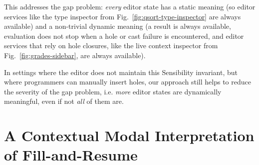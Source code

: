 This addresses the gap problem: \emph{every} editor state has a {static
meaning} (so editor services like the type inspector from Fig.~\ref{fig:qsort-type-inspector} are always available) and a non-trivial {dynamic meaning} (a result is always available, evaluation does not stop when a hole or cast failure is encountered, and editor services that rely on hole closures, like the live context inspector from Fig.~\ref{fig:grades-sidebar}, are always available).

In settings where the editor does not maintain this Sensibility invariant, but where programmers can manually insert holes, our approach still helps to reduce the severity of the gap problem, i.e. \emph{more} editor states are dynamically meaningful, even if not \emph{all} of them are.%
%






\newcommand{\commutativitySec}{A Contextual Modal Interpretation of Fill-and-Resume}
\section{\protect\commutativitySec}
\label{sec:resumption}


